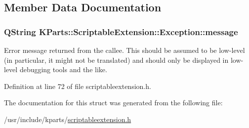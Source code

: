 \subsection{Member Data Documentation}
\hypertarget{structKParts_1_1ScriptableExtension_1_1Exception_aa077475854a1ee79ac8905a2e07be407}{
\subsubsection[{message}]{\setlength{\rightskip}{0pt plus 5cm}Q\+String K\+Parts\+::\+Scriptable\+Extension\+::\+Exception\+::message}}\label{structKParts_1_1ScriptableExtension_1_1Exception_aa077475854a1ee79ac8905a2e07be407}
Error message returned from the callee. This should be assumed to be low-\/level (in particular, it might not be translated) and should only be displayed in low-\/level debugging tools and the like. 

Definition at line 72 of file scriptableextension.\+h.



The documentation for this struct was generated from the following file\+:\begin{DoxyCompactItemize}
\item 
/usr/include/kparts/\hyperlink{scriptableextension_8h}{scriptableextension.\+h}\end{DoxyCompactItemize}

